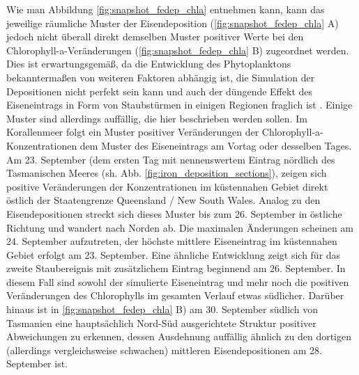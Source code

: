 \documentclass[12pt,a4paper,onecolumn]{scrartcl}
\begin{document}
Wie man Abbildung \ref{fig:snapshot_fedep_chla} entnehmen kann, kann das jeweilige räumliche Muster der Eisendeposition (\ref{fig:snapshot_fedep_chla} A) jedoch nicht überall direkt demselben Muster positiver Werte bei den Chlorophyll-a-Veränderungen (\ref{fig:snapshot_fedep_chla} B) zugeordnet werden. Dies ist erwartungsgemäß, da die Entwicklung des Phytoplanktons bekanntermaßen von weiteren Faktoren abhängig ist, die Simulation der Depositionen nicht perfekt sein kann und auch der düngende Effekt des Eiseneintrags in Form von Staubstürmen in einigen Regionen fraglich ist \citep{Boyd.2010}. Einige Muster sind allerdings auffällig, die hier beschrieben werden sollen. Im Korallenmeer folgt ein Muster positiver Veränderungen der Chlorophyll-a-Konzentrationen dem Muster des Eiseneintrags am Vortag oder desselben Tages. Am 23. September (dem ersten Tag mit nennenswertem Eintrag nördlich des Tasmanischen Meeres (sh. Abb. \ref{fig:iron_deposition_sections}), zeigen sich positive Veränderungen der Konzentrationen im küstennahen Gebiet direkt östlich der Staatengrenze Queensland / New South Wales. Analog zu den Eisendepositionen streckt sich dieses Muster bis zum 26. September in östliche Richtung und wandert nach Norden ab. Die maximalen Änderungen scheinen am 24. September aufzutreten, der höchste mittlere Eiseneintrag im küstennahen Gebiet erfolgt am 23. September. Eine ähnliche Entwicklung zeigt sich für das  zweite Staubereignis mit zusätzlichem Eintrag beginnend am 26. September. In diesem Fall sind sowohl der simulierte Eiseneintrag und mehr noch die positiven Veränderungen des Chlorophylls im gesamten Verlauf etwas südlicher. Darüber hinaus ist in \ref{fig:snapshot_fedep_chla} B) am 30. September südlich von Tasmanien eine hauptsächlich Nord-Süd ausgerichtete Struktur positiver Abweichungen zu erkennen, dessen Ausdehnung auffällig ähnlich zu den dortigen (allerdings vergleichsweise schwachen) mittleren Eisendepositionen am 28. September ist. \\
\end{document}
